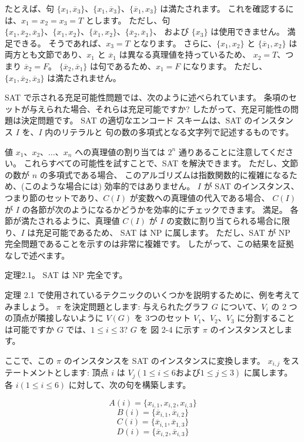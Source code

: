 
たとえば、句 $\{x_1, \overline{x}_3\}、\{x_1, \overline{x}_3\}、\{\overline{x}_1, x_3\}$ は満たされます。 
これを確認するには、$x_1=x_2=x_3=T$ とします。 ただし、句 $\{x_1, \overline{x}_2, \overline{x}_3\}、\{x_1, x_2\}、\{\overline{x}_1, x_2\}、\{\overline{x}_2, \overline{x}_1\}$、
および $\{x_3\}$ は使用できません。 満足できる。 そうであれば、$x_3 = T$ となります。 
さらに、$\{x_1, x_2\}$ と $\{\overline{x}_1, x_2\}$ は両方とも文節であり、$x_1$ と $\overline{x}_1$ は異なる真理値を持っているため、
$x_2 = T$、つまり $\overline{x}_2 = F$。 $\{\overline{x}_2, \overline{x}_1\}$ は句であるため、$x_1 = F$ になります。 ただし、$\{x_1, \overline{x}_2, \overline{x}_3\}$ は満たされません。

SAT で示される充足可能性問題では、次のように述べられています。
条項のセットが与えられた場合、それらは充足可能ですか? 
したがって、充足可能性の問題は決定問題です。 SAT の適切なエンコード スキームは、SAT のインスタンス $I$ を、$I$ 内のリテラルと
句の数の多項式となる文字列で記述するものです。

値 $x_1、x_2、\dots、x_n$ への真理値の割り当ては $2^n$ 通りあることに注意してください。 
これらすべての可能性を試すことで、SAT を解決できます。 ただし、文節の数が $n$ の多項式である場合、
このアルゴリズムは指数関数的に複雑になるため、(このような場合には) 効率的ではありません。 
$I$ が SAT のインスタンス、つまり節のセットであり、$C(I)$ が変数への真理値の代入である場合、
$C(I)$ が $I$ の各節が次のようになるかどうかを効率的にチェックできます。 満足。 
各節が満たされるように、真理値 $C(I)$ が $I$ の変数に割り当てられる場合に限り、$I$ は充足可能であるため、
SAT は NP に属します。 ただし、SAT が NP 完全問題であることを示すのは非常に複雑です。
したがって、この結果を証拠なしで述べます。

定理2.1。 SAT は NP 完全です。

定理 2.1 で使用されているテクニックのいくつかを説明するために、例を考えてみましょう。
$\pi$ を決定問題とします: 与えられたグラフ $G$ について、$V_i$ の 2 つの頂点が隣接しないように $V(G)$ を
3つのセット $V_1、V_2、V_3 $ に分割することは可能ですか $G$ では、$1 \leq i \leq 3$? $G$ を
図 2-4 に示す $\pi$ のインスタンスとします。

ここで、この $\pi$ のインスタンスを SAT のインスタンスに変換します。
$x_{i,j}$ をステートメントとします: 頂点 $i$ は $V_j (1 \leq i \leq 6 および 1 \leq j \leq 3)$ に属します。
各 $i (1 \leq i \leq 6)$ に対して、次の句を構築します。

$$A(i) = \{x_{i,1}, x_{i,2}, x_{i,3}\}$$
$$B(i) = \{\overline{x}_{i,1},\overline{x}_{i,2}\}$$
$$C(i) = \{\overline{x}_{i,1}, \overline{x}_{1,3}\}$$
$$D(i) = \{\overline{x}_{i,2}, \overline{x}_{i,3}\}$$